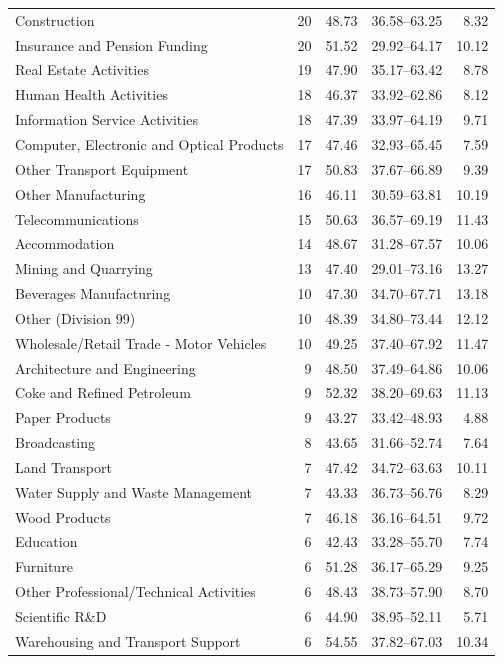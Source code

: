 \begin{table}[p]
\begin{singlepagetable}
\begin{tabularx}{\linewidth}{@{}Yrrrr@{}}
Construction & 20 & 48.73 & 36.58--63.25 & 8.32 \\
Insurance and Pension Funding & 20 & 51.52 & 29.92--64.17 & 10.12 \\
Real Estate Activities & 19 & 47.90 & 35.17--63.42 & 8.78 \\
Human Health Activities & 18 & 46.37 & 33.92--62.86 & 8.12 \\
Information Service Activities & 18 & 47.39 & 33.97--64.19 & 9.71 \\
Computer, Electronic and Optical Products & 17 & 47.46 & 32.93--65.45 & 7.59 \\
Other Transport Equipment & 17 & 50.83 & 37.67--66.89 & 9.39 \\
Other Manufacturing & 16 & 46.11 & 30.59--63.81 & 10.19 \\
Telecommunications & 15 & 50.63 & 36.57--69.19 & 11.43 \\
Accommodation & 14 & 48.67 & 31.28--67.57 & 10.06 \\
Mining and Quarrying & 13 & 47.40 & 29.01--73.16 & 13.27 \\
Beverages Manufacturing & 10 & 47.30 & 34.70--67.71 & 13.18 \\
Other (Division 99) & 10 & 48.39 & 34.80--73.44 & 12.12 \\
Wholesale/Retail Trade - Motor Vehicles & 10 & 49.25 & 37.40--67.92 & 11.47 \\
Architecture and Engineering & 9 & 48.50 & 37.49--64.86 & 10.06 \\
Coke and Refined Petroleum & 9 & 52.32 & 38.20--69.63 & 11.13 \\
Paper Products & 9 & 43.27 & 33.42--48.93 & 4.88 \\
Broadcasting & 8 & 43.65 & 31.66--52.74 & 7.64 \\
Land Transport & 7 & 47.42 & 34.72--63.63 & 10.11 \\
Water Supply and Waste Management & 7 & 43.33 & 36.73--56.76 & 8.29 \\
Wood Products & 7 & 46.18 & 36.16--64.51 & 9.72 \\
Education & 6 & 42.43 & 33.28--55.70 & 7.74 \\
Furniture & 6 & 51.28 & 36.17--65.29 & 9.25 \\
Other Professional/Technical Activities & 6 & 48.43 & 38.73--57.90 & 8.70 \\
Scientific R\&D & 6 & 44.90 & 38.95--52.11 & 5.71 \\
Warehousing and Transport Support & 6 & 54.55 & 37.82--67.03 & 10.34 \\

\end{tabularx}
\end{singlepagetable}
\end{table}
